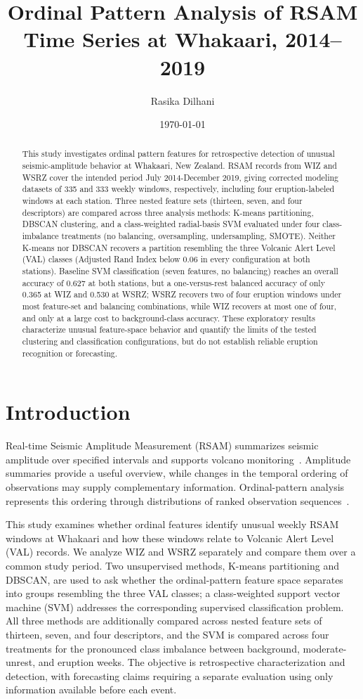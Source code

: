 \documentclass[11pt,a4paper]{article}
\title{Ordinal Pattern Analysis of RSAM Time Series at Whakaari, 2014--2019}
\author{Rasika Dilhani}
\date{\today}
\begin{document}
	\maketitle
	\begin{abstract}
		This study investigates ordinal pattern features for retrospective detection of unusual seismic-amplitude behavior at Whakaari, New Zealand. RSAM records from WIZ and WSRZ cover the intended period July 2014-December 2019, giving corrected modeling datasets of 335 and 333 weekly windows, respectively, including four eruption-labeled windows at each station. Three nested feature sets (thirteen, seven, and four descriptors) are compared across three analysis methods: K-means partitioning, DBSCAN clustering, and a class-weighted radial-basis SVM evaluated under four class-imbalance treatments (no balancing, oversampling, undersampling, SMOTE). Neither K-means nor DBSCAN recovers a partition resembling the three Volcanic Alert Level (VAL) classes (Adjusted Rand Index below 0.06 in every configuration at both stations). Baseline SVM classification (seven features, no balancing) reaches an overall accuracy of 0.627 at both stations, but a one-versus-rest balanced accuracy of only 0.365 at WIZ and 0.530 at WSRZ; WSRZ recovers two of four eruption windows under most feature-set and balancing combinations, while WIZ recovers at most one of four, and only at a large cost to background-class accuracy. These exploratory results characterize unusual feature-space behavior and quantify the limits of the tested clustering and classification configurations, but do not establish reliable eruption recognition or forecasting.
	\end{abstract}
	
\section{Introduction}
Real-time Seismic Amplitude Measurement (RSAM) summarizes seismic amplitude over specified intervals and supports volcano monitoring~\cite{Endo1991}. Amplitude summaries provide a useful overview, while changes in the temporal ordering of observations may supply complementary information. Ordinal-pattern analysis represents this ordering through distributions of ranked observation sequences~\cite{Bandt2002}.

This study examines whether ordinal features identify unusual weekly RSAM windows at Whakaari and how these windows relate to Volcanic Alert Level (VAL) records. We analyze WIZ and WSRZ separately and compare them over a common study period. Two unsupervised methods, K-means partitioning and DBSCAN, are used to ask whether the ordinal-pattern feature space separates into groups resembling the three VAL classes; a class-weighted support vector machine (SVM) addresses the corresponding supervised classification problem. All three methods are additionally compared across nested feature sets of thirteen, seven, and four descriptors, and the SVM is compared across four treatments for the pronounced class imbalance between background, moderate-unrest, and eruption weeks. The objective is retrospective characterization and detection, with forecasting claims requiring a separate evaluation using only information available before each event.
\end{document}
